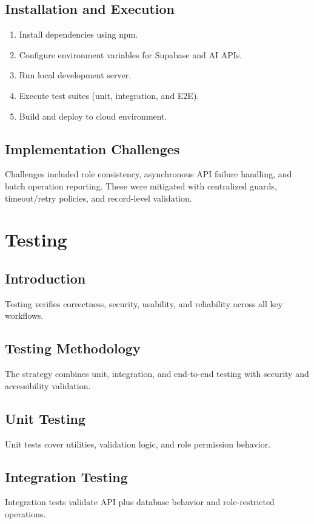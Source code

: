 \documentclass[12pt,a4paper]{article}
\begin{document}
\subsection{Installation and Execution}
\begin{enumerate}
\item Install dependencies using npm.
\item Configure environment variables for Supabase and AI APIs.
\item Run local development server.
\item Execute test suites (unit, integration, and E2E).
\item Build and deploy to cloud environment.
\end{enumerate}

\subsection{Implementation Challenges}
Challenges included role consistency, asynchronous API failure handling, and batch operation reporting. These were mitigated with centralized guards, timeout/retry policies, and record-level validation.

\section{Testing}

\subsection{Introduction}
Testing verifies correctness, security, usability, and reliability across all key workflows.

\subsection{Testing Methodology}
The strategy combines unit, integration, and end-to-end testing with security and accessibility validation.

\subsection{Unit Testing}
Unit tests cover utilities, validation logic, and role permission behavior.

\subsection{Integration Testing}
Integration tests validate API plus database behavior and role-restricted operations.
\end{document}
